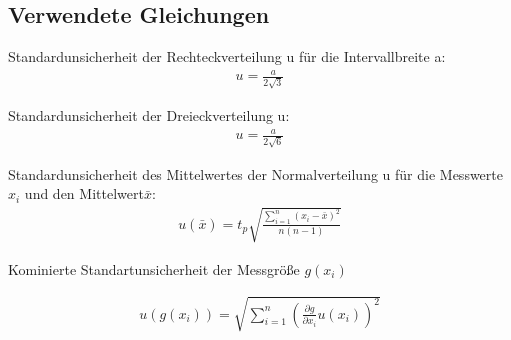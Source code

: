 

\subsection{Verwendete Gleichungen}\label{VGuD}







Standardunsicherheit der Rechteckverteilung u für die Intervallbreite a:
\begin{align}
	u=\frac{a}{2\sqrt{3}}\label{eq:sur}
	\end{align} 
	
	
Standardunsicherheit der Dreieckverteilung u: \begin{align}
	u=\frac{a}{2\sqrt{6}}\label{eq:sud}
\end{align}

Standardunsicherheit des Mittelwertes der Normalverteilung u für die Messwerte $x_i$ und den Mittelwert$\bar{x}$:
\begin{align}
	u(\bar{x})=  t_p  \sqrt{  \frac{\sum_{i=1}^{n}  (x_i-\bar{x})^2} {n (n-1)} }
	\label{eq:sunv}       
\end{align} 


Kominierte Standartunsicherheit der Messgröße $g(x_i)$

\begin{align}
	u(g(x_i))=   \sqrt{  \sum_{i=1}^{n} \left( \frac{\partial g}{\partial x_i} u(x_i) \right)^2  }
	\label{eq:sunv}       
\end{align} 




